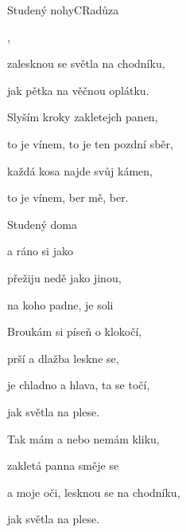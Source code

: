 \begin{song}{Studený nohy}{C}{Radůza}

\begin{SBVerse}

 ,

  

zalesknou se světla na chodníku,

jak pětka na věčnou oplátku.

\end{SBVerse}

\begin{SBVerse}

Slyším kroky zakletejch panen,

to je vínem, to je ten pozdní sběr,

každá kosa najde svůj kámen,

to je vínem, ber mě, ber.

\end{SBVerse}

\begin{SBChorus}

Studený   doma 

a ráno  si  jako 

přežiju  nedě jako  jinou,

na koho  padne,  je soli 

\end{SBChorus}

\begin{SBVerse}

Broukám si píseň o klokočí,

prší a dlažba leskne se,

je chladno a hlava, ta se točí,

jak světla na plese.

\end{SBVerse}

\begin{SBChorus}

\end{SBChorus}

\begin{SBVerse}

Tak mám a nebo nemám kliku,

zakletá panna směje se

a moje oči, lesknou se na chodníku,

jak světla na plese.

\end{SBVerse}

\begin{SBChorus}

\end{SBChorus}

\end{song}

\clearpage